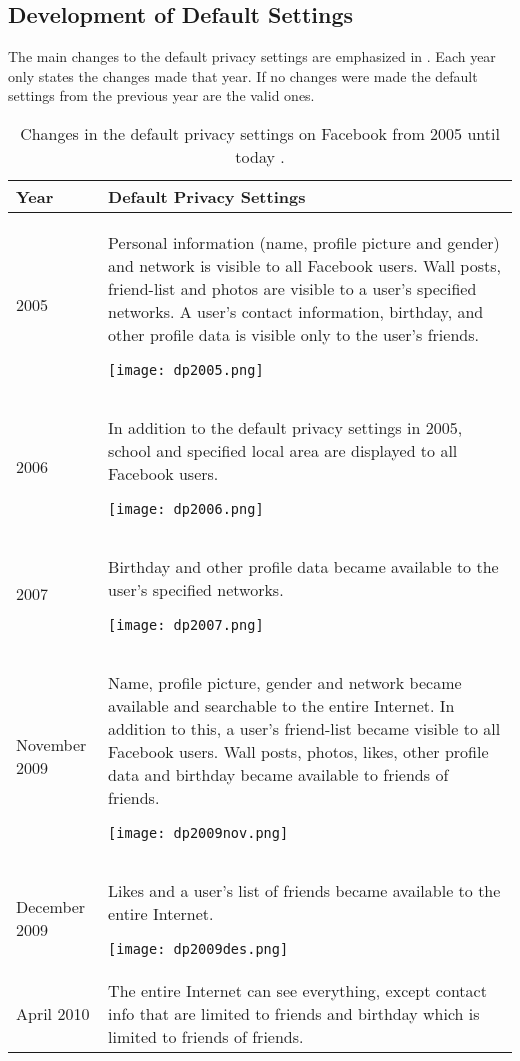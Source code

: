 \subsection{Development of Default Settings}

The main changes to the default privacy settings are emphasized in . Each year only states the changes made that year. If no changes were made the default settings from the previous year are the valid ones. 

\begin{center}
\begin{longtable}{ | p{1.3cm} | p{10.6cm} |}
\caption{\label{tab:dps}Changes in the default privacy settings on Facebook from 2005 until today \cite{EvoPriv,PrivTimeline}.}\\
    \hline
    \textbf{Year} & \textbf{Default Privacy Settings} \\ 
    \hline
    2005 & Personal information (name, profile picture and gender) and network is visible to all Facebook users. Wall posts, friend-list and photos are visible to a user's specified networks. A user's contact information, birthday, and other profile data is visible only to the user's friends. 
    
    \texttt{[image: dp2005.png]}\\ 
    \hline
    2006 & In addition to the default privacy settings in 2005, school and specified local area are displayed to all Facebook users.  
    
    \texttt{[image: dp2006.png]} \\ 
    \hline
    2007 & Birthday and other profile data became available to the user's specified networks. 
    
    \texttt{[image: dp2007.png]}\\
    \hline
    November 2009 & Name, profile picture, gender and network became 			available and searchable to the entire Internet. In addition to this, a user's friend-list became visible to all Facebook users. Wall posts, photos, likes, other profile data and birthday became available to friends of friends. 
    
    \texttt{[image: dp2009nov.png]}\\
	\hline
    December 2009 & Likes and a user's list of friends became available to the entire Internet. 
    
    \texttt{[image: dp2009des.png]}\\
    \hline
    April 2010 & The entire Internet can see everything, except contact info that are limited to friends and birthday which is limited to friends of friends.
    

\end{longtable}
\end{center}
